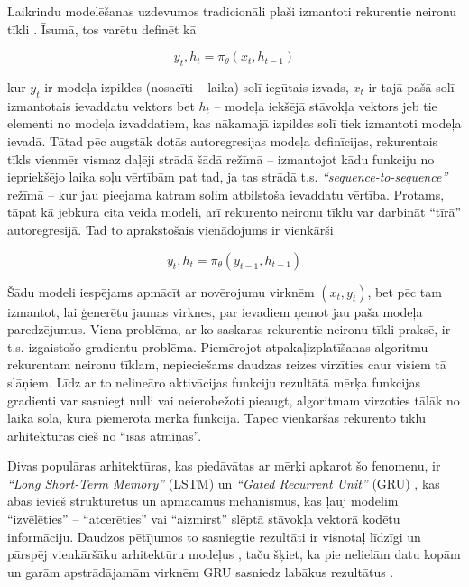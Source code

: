 \documentclass[12pt, a4paper]{article}
\numberwithin{equation}{section} %
\begin{document}
Laikrindu modelēšanas uzdevumos tradicionāli plaši izmantoti rekurentie neironu tīkli \cite{rnn}. Īsumā, tos varētu definēt kā 

\begin{equation} 
    y_t, h_t = \pi_{\theta}(x_t, h_{t-1})
\end{equation}

kur $y_t$ ir modeļa izpildes (nosacīti -- laika) solī iegūtais izvads, $x_t$ ir tajā pašā solī izmantotais ievaddatu vektors bet $h_t$ -- modeļa iekšējā stāvokļa vektors jeb tie elementi no modeļa izvaddatiem, kas nākamajā izpildes solī tiek izmantoti modeļa ievadā. Tātad pēc augstāk dotās autoregresijas modeļa definīcijas, rekurentais tīkls vienmēr vismaz daļēji strādā šādā režīmā -- izmantojot kādu funkciju no iepriekšējo laika soļu vērtībām pat tad, ja tas strādā t.s. \textit{``sequence-to-sequence''} režīmā -- kur jau pieejama katram solim atbilstoša ievaddatu vērtība. Protams, tāpat kā jebkura cita veida modeli, arī rekurento neironu tīklu var darbināt ``tīrā'' autoregresijā. Tad to aprakstošais vienādojums ir vienkārši

\begin{equation} 
    y_t, h_t = \pi_{\theta}(y_{t-1}, h_{t-1})
\end{equation}

Šādu modeli iespējams apmācīt ar novērojumu virknēm $(x_t,y_t)$, bet pēc tam izmantot, lai ģenerētu jaunas virknes, par ievadiem ņemot jau paša modeļa paredzējumus. Viena problēma, ar ko saskaras rekurentie neironu tīkli praksē, ir t.s. izgaistošo gradientu problēma. Piemērojot atpakaļizplatīšanas algoritmu rekurentam neironu tīklam, nepieciešams daudzas reizes virzīties caur visiem tā slāņiem. Līdz ar to nelineāro aktivācijas funkciju rezultātā mērķa funkcijas gradienti var sasniegt nulli vai neierobežoti pieaugt, algoritmam virzoties tālāk no laika soļa, kurā piemērota mērķa funkcija. Tāpēc vienkāršas rekurento tīklu arhitektūras cieš no ``īsas atmiņas''. 

Divas populāras arhitektūras, kas piedāvātas ar mērķi apkarot šo fenomenu, ir \textit{``Long Short-Term Memory''} (LSTM) \cite{hochreiter1997long} un \textit{``Gated Recurrent Unit''} (GRU) \cite{cho2014properties}, kas abas ievieš strukturētus un apmācāmus mehānismus, kas ļauj modelim ``izvēlēties'' -- ``atcerēties'' vai ``aizmirst'' slēptā stāvokļa vektorā kodētu informāciju. Daudzos pētījumos to sasniegtie rezultāti ir visnotaļ līdzīgi un pārspēj vienkāršāku arhitektūru modeļus \cite{chung2014empirical}, taču šķiet, ka pie nelielām datu kopām un garām apstrādājamām virknēm GRU sasniedz labākus rezultātus \cite{yang2020lstm}.
\end{document}
